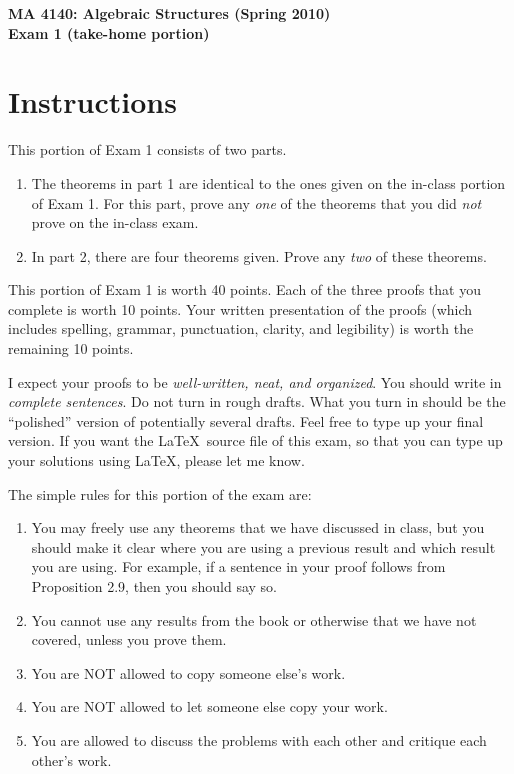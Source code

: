 \documentclass[11pt]{article}
\theoremstyle{definition}
\begin{document}
\begin{center}

{\Large\bf MA 4140: Algebraic Structures (Spring 2010)}\\
\smallskip
{\Large\bf Exam 1 (take-home portion)}

\bigskip


\end{center}

\setlength{\fboxsep}{10pt}

\section*{Instructions}
This portion of Exam 1 consists of two parts.

\begin{enumerate}

\item The theorems in part 1 are identical to the ones given on the in-class portion of Exam 1.  For this part, prove any \emph{one} of the theorems that you did \emph{not} prove on the in-class exam.

\item In part 2, there are four theorems given.  Prove any \emph{two} of these theorems.

\end{enumerate}

This portion of Exam 1 is worth 40 points.  Each of the three proofs that you complete is worth 10 points.  Your written presentation of the proofs (which includes spelling, grammar, punctuation, clarity, and legibility) is worth the remaining 10 points.

I expect your proofs to be \emph{well-written, neat, and organized}.  You should write in \emph{complete sentences}.  Do not turn in rough drafts.  What you turn in should be the ``polished'' version of potentially several drafts.  Feel free to type up your final version.  If you want the \LaTeX\ source file of this exam, so that you can type up your solutions using \LaTeX, please let me know.

The simple rules for this portion of the exam are:

\begin{enumerate}
\item You may freely use any theorems that we have discussed in class, but you should make it clear where you are using a previous result and which result you are using.  For example, if a sentence in your proof follows from Proposition 2.9, then you should say so.
\item You cannot use any results from the book or otherwise that we have not covered, unless you prove them.
\item You are NOT allowed to copy someone else's work.
\item You are NOT allowed to let someone else copy your work.
\item You are allowed to discuss the problems with each other and critique each other's work.
\end{enumerate}
\end{document}

